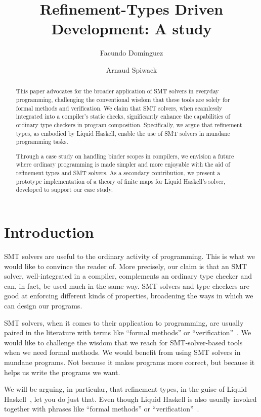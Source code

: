 \documentclass[sigconf, review]{acmart}
\title{Refinement-Types Driven Development: A study}
\author{Facundo Domínguez}
\affiliation{
     \institution{Tweag}
     \country{France}
}
\author{Arnaud Spiwack}
\affiliation{
     \institution{Tweag}
     \country{France}
}
\begin{document}
\begin{abstract}
    This paper advocates for the broader application of SMT solvers in everyday
    programming, challenging the conventional wisdom that these tools are
    solely for formal methods and verification. We claim that SMT solvers, when
    seamlessly integrated into a compiler's static checks, significantly
    enhance the capabilities of ordinary type checkers in program composition.
    Specifically, we argue that refinement types, as embodied by Liquid Haskell,
    enable the use of SMT solvers in mundane programming tasks.

    Through a case study on handling binder scopes in compilers, we envision a
    future where ordinary programming is made simpler and more enjoyable with the
    aid of refinement types and SMT solvers. As a secondary contribution, we
    present a prototype implementation of a theory of finite maps for Liquid
    Haskell's solver, developed to support our case study.
\end{abstract}
\maketitle

\section{Introduction}

SMT solvers are useful to the ordinary activity of
programming. This is what we would like to convince the reader of. More
precisely, our claim is that an SMT solver, well-integrated in
a compiler, complements an ordinary type checker and can, in fact, be used much in
the same way. SMT solvers and type checkers are good at enforcing different kinds of
properties, broadening the ways in which we can design our programs.

SMT solvers, when it comes to their application to programming, are usually
paired in the literature with terms like ``formal methods'' or
``verification''~\cite{barnett05,demoura08,zinzin17,swamy22,filli13,leino17}. We
would like to challenge the wisdom that we reach for SMT-solver-based tools when
we need formal methods. We would benefit from using SMT solvers in mundane
programs. Not because it makes programs more correct, but because it helps us
write the programs we want.

We will be arguing, in particular, that refinement types, in the guise of Liquid
Haskell~\cite{vazou14b}, let you do just that. Even though Liquid
Haskell is also usually invoked together with phrases like ``formal methods'' or
``verification''~\cite{vazou14,lehmann21,liu20,redmond23}.
\end{document}
